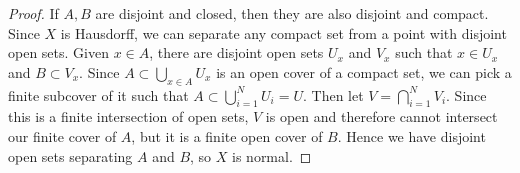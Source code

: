 \begin{proof}
	
	
	If $A,B$ are disjoint and closed, then they are also disjoint and compact.  Since $X$ is Hausdorff, we can separate any compact set from a point with disjoint open sets.  Given $x\in A$, there are disjoint open sets $U_x$ and $V_x$ such that $x\in U_x$ and $B\subset V_x$.  Since $A\subset\bigcup\limits_{x\in A} U_x$ is an open cover of a compact set, we can pick a finite subcover of it such that $A\subset \bigcup\limits_{i=1}^N U_i = U$.  Then let $V=\bigcap\limits_{i=1}^N V_i$.  Since this is  a finite intersection of open sets, $V$ is open and therefore cannot intersect our finite cover of $A$, but it is a finite open cover of $B$.  Hence we have disjoint open sets separating $A$ and $B$, so $X$ is normal.
	
	
\end{proof}